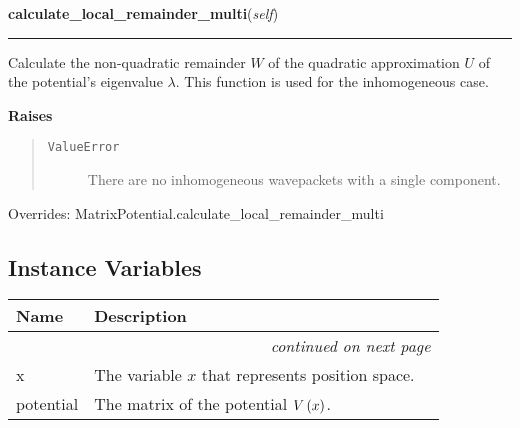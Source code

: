     \vspace{0.5ex}

\hspace{.8\funcindent}\begin{boxedminipage}{\funcwidth}

    \raggedright \textbf{calculate\_local\_remainder\_multi}(\textit{self})

    \vspace{-1.5ex}

    \rule{\textwidth}{0.5\fboxrule}
\setlength{\parskip}{2ex}
    Calculate the non-quadratic remainder $W$ of the quadratic
    approximation $U$ of the potential's eigenvalue
    $\lambda$. This function is used for the inhomogeneous
    case.

\setlength{\parskip}{1ex}
      \textbf{Raises}
    \vspace{-1ex}

      \begin{quote}
        \begin{description}

          \item[\texttt{ValueError}]

          There are no inhomogeneous wavepackets with a single component.

        \end{description}

      \end{quote}

      Overrides: MatrixPotential.calculate\_local\_remainder\_multi

    \end{boxedminipage}



  \subsection{Instance Variables}

    \vspace{-1cm}
\hspace{\varindent}\begin{longtable}{|p{\varnamewidth}|p{\vardescrwidth}|l}
\cline{1-2}
\cline{1-2} \centering \textbf{Name} & \centering \textbf{Description}& \\
\cline{1-2}
\endhead\cline{1-2}\multicolumn{3}{r}{\small\textit{continued on next page}}\\\endfoot\cline{1-2}
\endlastfoot\raggedright x\- & The variable $x$ that represents position space.&\\
\cline{1-2}
\raggedright p\-o\-t\-e\-n\-t\-i\-a\-l\- & The matrix of the potential $V\left( x \right)$.&\\
\cline{1-2}
\end{longtable}

